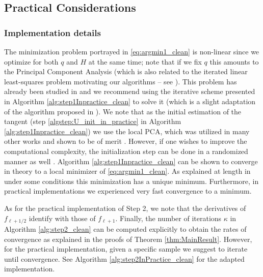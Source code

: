 \documentclass[12pt]{article}
\theoremstyle{remark}
\begin{document}
\subsection{Practical Considerations}\label{sec:practical}
\subsubsection{Implementation details}
The minimization problem portrayed in \eqref{eq:argmin1_clean} is non-linear since we optimize for both $q$ and $H$ at the same time; note that if we fix $q$ this amounts to the Principal Component Analysis (which is also related to the iterated linear least-squares problem motivating our algorithms -- see \cite{aizenbud2019approximating}).
This problem has already been studied in \cite{sober2017approximation,sober2016MMLS} and we recommend using the iterative scheme presented in Algorithm \ref{alg:step1Inpractice_clean} to solve it (which is a slight adaptation of the algorithm proposed in \cite{sober2016MMLS}). We note that as the initial estimation of the tangent (step \ref{algstep:U_init_in_practice} in Algorithm \ref{alg:step1Inpractice_clean}) we use the local PCA, which was utilized in many other works and shown to be of merit \cite{aamari2019nonasymptotic,aizenbud2015OutOfSample,kaslovsky2014non}. However, if one wishes to improve the computational complexity, the initialization step can be done in a randomized manner as well \cite{aizenbud2016SVD,halko2011algorithm}.
Algorithm \ref{alg:step1Inpractice_clean} can be shown to converge in theory to a local minimizer of \eqref{eq:argmin1_clean}. 
As explained at length in \cite{sober2016MMLS} under some conditions this minimization has a unique minimum. 
Furthermore, in practical implementations we experienced very fast convergence to a minimum.

As for the practical implementation of Step 2, we note that the derivatives of $f_{\ell + 1/2}$ identify with those of $f_{\ell +1}$.
Finally, the number of iterations $\kappa$ in Algorithm \ref{alg:step2_clean} can be computed explicitly to obtain the rates of convergence as explained in the proofs of Theorem \ref{thm:MainResult}.
However, for the practical implementation, given a specific sample we suggest to iterate until convergence.
See Algorithm \ref{alg:step2InPractice_clean} for the adapted implementation.
\end{document}
